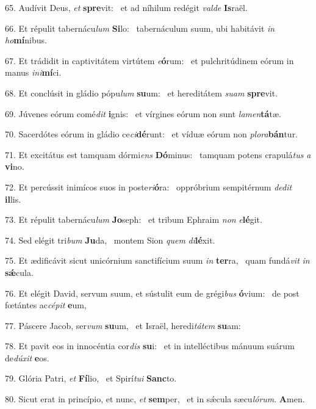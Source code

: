 65. Audívit Deus, \textit{et} \textbf{spre}vit: \ast\  et ad níhilum redégit \textit{val}\textit{de} \textbf{Is}raël.\

66. Et répulit tabernácu\textit{lum} \textbf{Si}lo: \ast\  tabernáculum suum, ubi habitávit \textit{in} \textit{ho}\textbf{mí}nibus.\

67. Et trádidit in captivitátem virtútem \textit{e}\textbf{ó}rum: \ast\  et pulchritúdinem eórum in manus \textit{in}\textit{i}\textbf{mí}ci.\

68. Et conclúsit in gládio pópu\textit{lum} \textbf{su}um: \ast\  et hereditátem \textit{su}\textit{am} \textbf{spre}vit.\

69. Júvenes eórum comé\textit{dit} \textbf{i}gnis: \ast\  et vírgines eórum non sunt \textit{la}\textit{men}\textbf{tá}tæ.\

70. Sacerdótes eórum in gládio ce\textit{ci}\textbf{dé}runt: \ast\  et víduæ eórum non \textit{plo}\textit{ra}\textbf{bán}tur.\

71. Et excitátus est tamquam dórmi\textit{ens} \textbf{Dó}minus: \ast\  tamquam potens crapulá\textit{tus} \textit{a} \textbf{vi}no.\

72. Et percússit inimícos suos in poste\textit{ri}\textbf{ó}ra: \ast\  oppróbrium sempitérnum \textit{de}\textit{dit} \textbf{il}lis.\

73. Et répulit tabernácu\textit{lum} \textbf{Jo}seph: \ast\  et tribum Ephraim \textit{non} \textit{e}\textbf{lé}git.\

74. Sed elégit tri\textit{bum} \textbf{Ju}da, \ast\  montem Sion \textit{quem} \textit{di}\textbf{lé}xit.\

75. Et ædificávit sicut unicórnium sanctifícium suum \textit{in} \textbf{ter}ra, \ast\  quam fundá\textit{vit} \textit{in} \textbf{sǽ}cula.\

76. Et elégit David, servum suum, et sústulit eum de grégi\textit{bus} \textbf{ó}vium: \ast\  de post fœtántes ac\textit{cé}\textit{pit} \textbf{e}um,\

77. Páscere Jacob, ser\textit{vum} \textbf{su}um, \ast\  et Israël, heredi\textit{tá}\textit{tem} \textbf{su}am:\

78. Et pavit eos in innocéntia cor\textit{dis} \textbf{su}i: \ast\  et in intelléctibus mánuum suárum de\textit{dú}\textit{xit} \textbf{e}os.\

79. Glória Patri, \textit{et} \textbf{Fí}lio, \ast\  et Spirí\textit{tu}\textit{i} \textbf{Sanc}to.\

80. Sicut erat in princípio, et nunc, \textit{et} \textbf{sem}per, \ast\  et in sǽcula sæcu\textit{ló}\textit{rum}. \textbf{A}men.\

